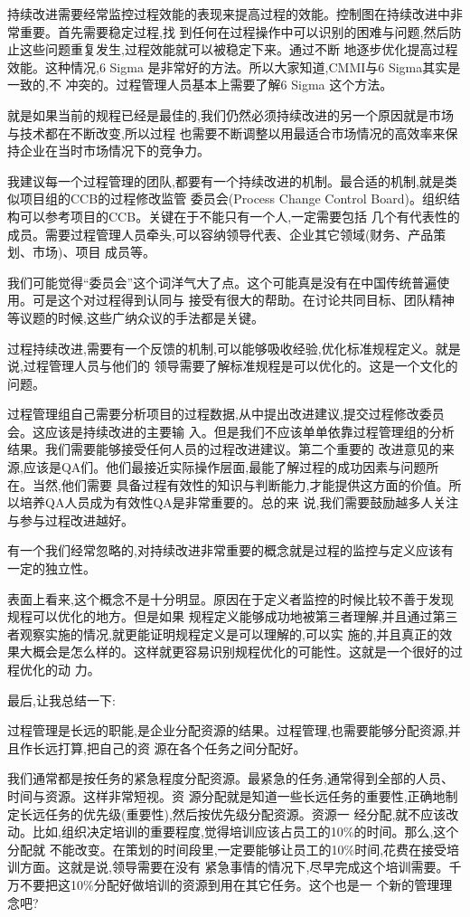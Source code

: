 \documentclass[11pt]{article}
\begin{document}
持续改进需要经常监控过程效能的表现来提高过程的效能。控制图在持续改进中非常重要。首先需要稳定过程,找
到任何在过程操作中可以识别的困难与问题,然后防止这些问题重复发生,过程效能就可以被稳定下来。通过不断
地逐步优化提高过程效能。这种情况,6 Sigma 是非常好的方法。所以大家知道,CMMI与6 Sigma其实是一致的,不
冲突的。过程管理人员基本上需要了解6 Sigma 这个方法。

就是如果当前的规程已经是最佳的,我们仍然必须持续改进的另一个原因就是市场与技术都在不断改变,所以过程
也需要不断调整以用最适合市场情况的高效率来保持企业在当时市场情况下的竞争力。

我建议每一个过程管理的团队,都要有一个持续改进的机制。最合适的机制,就是类似项目组的CCB的过程修改监管
委员会(Process Change Control Board)。组织结构可以参考项目的CCB。关键在于不能只有一个人,一定需要包括
几个有代表性的成员。需要过程管理人员牵头,可以容纳领导代表、企业其它领域(财务、产品策划、市场)、项目
成员等。

我们可能觉得``委员会''这个词洋气大了点。这个可能真是没有在中国传统普遍使用。可是这个对过程得到认同与
接受有很大的帮助。在讨论共同目标、团队精神等议题的时候,这些广纳众议的手法都是关键。

过程持续改进,需要有一个反馈的机制,可以能够吸收经验,优化标准规程定义。就是说,过程管理人员与他们的
领导需要了解标准规程是可以优化的。这是一个文化的问题。

过程管理组自己需要分析项目的过程数据,从中提出改进建议,提交过程修改委员会。这应该是持续改进的主要输
入。但是我们不应该单单依靠过程管理组的分析结果。我们需要能够接受任何人员的过程改进建议。第二个重要的
改进意见的来源,应该是QA们。他们最接近实际操作层面,最能了解过程的成功因素与问题所在。当然,他们需要
具备过程有效性的知识与判断能力,才能提供这方面的价值。所以培养QA人员成为有效性QA是非常重要的。总的来
说,我们需要鼓励越多人关注与参与过程改进越好。

有一个我们经常忽略的,对持续改进非常重要的概念就是过程的监控与定义应该有一定的独立性。

表面上看来,这个概念不是十分明显。原因在于定义者监控的时候比较不善于发现规程可以优化的地方。但是如果
规程定义能够成功地被第三者理解,并且通过第三者观察实施的情况,就更能证明规程定义是可以理解的,可以实
施的,并且真正的效果大概会是怎么样的。这样就更容易识别规程优化的可能性。这就是一个很好的过程优化的动
力。

最后,让我总结一下:

过程管理是长远的职能,是企业分配资源的结果。过程管理,也需要能够分配资源,并且作长远打算,把自己的资
源在各个任务之间分配好。

我们通常都是按任务的紧急程度分配资源。最紧急的任务,通常得到全部的人员、时间与资源。这样非常短视。资
源分配就是知道一些长远任务的重要性,正确地制定长远任务的优先级(重要性),然后按优先级分配资源。资源一
经分配,就不应该改动。比如,组织决定培训的重要程度,觉得培训应该占员工的10\%的时间。那么,这个分配就
不能改变。在策划的时间段里,一定要能够让员工的10\%时间,花费在接受培训方面。这就是说,领导需要在没有
紧急事情的情况下,尽早完成这个培训需要。千万不要把这10\%分配好做培训的资源到用在其它任务。这个也是一
个新的管理理念吧?
\end{document}
